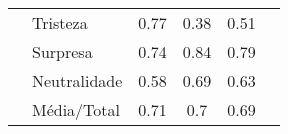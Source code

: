 \begin{table}[]
\begin{tabular}{llcccc}
                                        & Tristeza              & 0.77                                  & 0.38                                   & 0.51                                  &                                       \\
                                        & Surpresa              & 0.74                                  & 0.84                                   & 0.79                                  &                                       \\
                                        & Neutralidade          & 0.58                                  & 0.69                                   & 0.63                                  &                                       \\
                                        & Média/Total           & 0.71                                  & 0.7                                    & 0.69                                  &                                       \\ \hline
\end{tabular}
\end{table}




